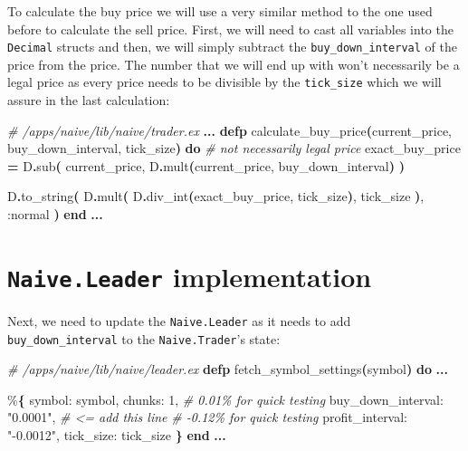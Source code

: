 \documentclass[
  oneside]{book}
\newenvironment{Shaded}{\begin{snugshade}}{\end{snugshade}}
\newcommand{\CommentTok}[1]{\textcolor[rgb]{0.56,0.35,0.01}{\textit{#1}}}
\newcommand{\DecValTok}[1]{\textcolor[rgb]{0.00,0.00,0.81}{#1}}
\newcommand{\FunctionTok}[1]{\textcolor[rgb]{0.13,0.29,0.53}{\textbf{#1}}}
\newcommand{\KeywordTok}[1]{\textcolor[rgb]{0.13,0.29,0.53}{\textbf{#1}}}
\newcommand{\NormalTok}[1]{#1}
\newcommand{\OperatorTok}[1]{\textcolor[rgb]{0.81,0.36,0.00}{\textbf{#1}}}
\newcommand{\StringTok}[1]{\textcolor[rgb]{0.31,0.60,0.02}{#1}}
\newcommand{\VariableTok}[1]{\textcolor[rgb]{0.00,0.00,0.00}{#1}}
\begin{document}
To calculate the buy price we will use a very similar method to the one used
before to calculate the sell price. First, we will need to cast all variables
into the \texttt{Decimal} structs and then, we will simply subtract the \texttt{buy\_down\_interval} of the price from the price. The number that we will end up with won't necessarily be a legal price as every price needs to be divisible by the \texttt{tick\_size} which we will assure in the last calculation:

\begin{Shaded}
\begin{Highlighting}[]
  \CommentTok{\# /apps/naive/lib/naive/trader.ex}
  \OperatorTok{...}
  \KeywordTok{defp}\NormalTok{ calculate\_buy\_price}\FunctionTok{(}\NormalTok{current\_price, buy\_down\_interval, tick\_size}\FunctionTok{)} \KeywordTok{do}
    \CommentTok{\# not necessarily legal price}
\NormalTok{    exact\_buy\_price }\OperatorTok{=}
\NormalTok{      D}\OperatorTok{.}\NormalTok{sub}\FunctionTok{(}
\NormalTok{        current\_price,}
\NormalTok{        D}\OperatorTok{.}\NormalTok{mult}\FunctionTok{(}\NormalTok{current\_price, buy\_down\_interval}\FunctionTok{)}
      \FunctionTok{)}

\NormalTok{    D}\OperatorTok{.}\NormalTok{to\_string}\FunctionTok{(}
\NormalTok{      D}\OperatorTok{.}\NormalTok{mult}\FunctionTok{(}
\NormalTok{        D}\OperatorTok{.}\NormalTok{div\_int}\FunctionTok{(}\NormalTok{exact\_buy\_price, tick\_size}\FunctionTok{)}\NormalTok{,}
\NormalTok{        tick\_size}
      \FunctionTok{)}\NormalTok{,}
      \VariableTok{:normal}
    \FunctionTok{)}
  \KeywordTok{end}
  \OperatorTok{...}
\end{Highlighting}
\end{Shaded}

\section{\texorpdfstring{\texttt{Naive.Leader} implementation}{Naive.Leader implementation}}\label{naive.leader-implementation}

Next, we need to update the \texttt{Naive.Leader} as it needs to add \texttt{buy\_down\_interval} to the \texttt{Naive.Trader}'s state:

\begin{Shaded}
\begin{Highlighting}[]
  \CommentTok{\# /apps/naive/lib/naive/leader.ex}
  \KeywordTok{defp}\NormalTok{ fetch\_symbol\_settings}\FunctionTok{(}\NormalTok{symbol}\FunctionTok{)} \KeywordTok{do}
    \OperatorTok{...}

\NormalTok{    \%}\FunctionTok{\{}
      \VariableTok{symbol:}\NormalTok{ symbol,}
      \VariableTok{chunks:} \DecValTok{1}\NormalTok{,}
      \CommentTok{\# 0.01\% for quick testing}
      \VariableTok{buy\_down\_interval:} \StringTok{"0.0001"}\NormalTok{, }\CommentTok{\# \textless{}= add this line}
      \CommentTok{\# {-}0.12\% for quick testing}
      \VariableTok{profit\_interval:} \StringTok{"{-}0.0012"}\NormalTok{,}
      \VariableTok{tick\_size:}\NormalTok{ tick\_size}
    \FunctionTok{\}}
  \KeywordTok{end}  
  \OperatorTok{...}
\end{Highlighting}
\end{Shaded}
\end{document}
